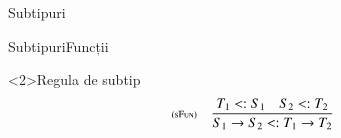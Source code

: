 \documentclass[xcolor=pdftex,romanian,colorlinks]{beamer}
\begin{document}
\begin{section}{Subtipuri}
\begin{frame}[fragile]{Subtipuri}{Funcții}
\begin{block}<2>{Regula de subtip}
\[\reg[sFun]{S_1 \rightarrow S_2 \stip T_1 \rightarrow T_2}{T_1 \stip S_1 \si S_2\stip T_2}{}\] 
\end{block}
\end{frame}



\end{section}
\end{document}
